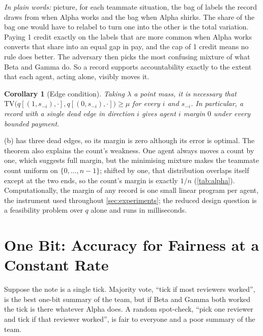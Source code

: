 \documentclass[sigconf,anonymous,acmthm=false]{acmart}
\theoremstyle{acmplain}
\newtheorem{corollary}{Corollary}
\theoremstyle{acmdefinition}
\newcommand{\plain}[1]{\par\smallskip\noindent\textit{In plain words:} #1\par\smallskip}
\newcommand{\TV}{\mathrm{TV}}
\newcommand{\A}{\textsf{Alpha}}
\newcommand{\B}{\textsf{Beta}}
\newcommand{\G}{\textsf{Gamma}}
\begin{document}
\plain{picture, for each teammate situation, the bag of labels the record draws from when
\A{} works and the bag when \A{} shirks. The share of the bag one would have to relabel to
turn one into the other is the total variation. Paying 1 credit exactly on the labels that
are more common when \A{} works converts that share into an equal gap in pay, and the cap
of 1 credit means no rule does better. The adversary then picks the most confusing mixture
of what \B{} and \G{} do. So a record supports accountability exactly to the extent that
each agent, acting alone, visibly moves it.}

\begin{corollary}[Edge condition]\label{cor:edge}
Taking $\lambda$ a point mass, it is necessary that
$\TV\big(q[(1,s_{-i}),\cdot],q[(0,s_{-i}),\cdot]\big)\ge\mu$ for every $i$ and $s_{-i}$. In
particular, a record with a single dead edge in direction $i$ gives agent $i$ margin $0$
under every bounded payment.
\end{corollary}

(b) has three dead edges, so its margin is zero although its error is
optimal. The theorem also explains the count's weakness. One agent always moves a count by
one, which suggests full margin, but the minimising mixture makes the teammate count
uniform on $\{0,\dots,n-1\}$; shifted by one, that distribution overlaps itself except at
the two ends, so the count's margin is exactly $1/n$ (\cref{tab:alpha}). Computationally,
the margin of any record is one small linear program per agent, the instrument used
throughout \cref{sec:experiments}; the reduced design question is a feasibility problem
over $q$ alone and runs in milliseconds.

\section{One Bit: Accuracy for Fairness at a Constant Rate}\label{sec:onebit}

\begin{story}
Suppose the note is a single tick. Majority vote, ``tick if most reviewers worked'', is the
best one-bit summary of the team, but if \B{} and \G{} both worked the tick is there
whatever \A{} does. A random spot-check, ``pick one reviewer and tick if that reviewer
worked'', is fair to everyone and a poor summary of the team.
\end{story}
\end{document}
